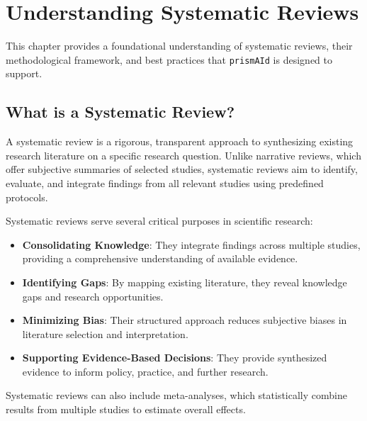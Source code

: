 \chapter{Understanding Systematic Reviews} \label{chap:sysrev}

This chapter provides a foundational understanding of systematic reviews, their methodological framework, and best practices that \texttt{prismAId} is designed to support.

\section{What is a Systematic Review?}

A systematic review is a rigorous, transparent approach to synthesizing existing research literature on a specific research question. Unlike narrative reviews, which offer subjective summaries of selected studies, systematic reviews aim to identify, evaluate, and integrate findings from all relevant studies using predefined protocols.

Systematic reviews serve several critical purposes in scientific research:

\begin{itemize}
    \item \textbf{Consolidating Knowledge}: They integrate findings across multiple studies, providing a comprehensive understanding of available evidence.
    \item \textbf{Identifying Gaps}: By mapping existing literature, they reveal knowledge gaps and research opportunities.
    \item \textbf{Minimizing Bias}: Their structured approach reduces subjective biases in literature selection and interpretation.
    \item \textbf{Supporting Evidence-Based Decisions}: They provide synthesized evidence to inform policy, practice, and further research.
\end{itemize}

Systematic reviews can also include meta-analyses, which statistically combine results from multiple studies to estimate overall effects.

